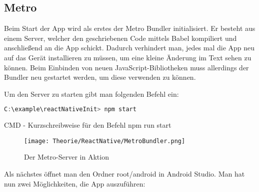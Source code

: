 \newpage
\subsection{Metro}
\label{metrobundler}
Beim Start der App wird als erstes der Metro Bundler initialisiert. Er besteht aus einem Server,
welcher den geschriebenen Code mittels Babel kompiliert und anschließend an die App schickt. Dadurch
verhindert man, jedes mal die App neu auf das Gerät installieren zu müssen, um eine kleine Änderung
im Text sehen zu können. Beim Einbinden von neuen JavaScript-Bibliotheken muss allerdings der
Bundler neu gestartet werden, um diese verwenden zu können.

Um den Server zu starten gibt man folgenden Befehl ein:

\begin{code}[htp]
\begin{lstlisting}[firstnumber=1,language=JavaScript, style=CMD]
C:\example\reactNativeInit> npm start
\end{lstlisting}
\caption{CMD - Kurzschreibweise für den Befehl npm run start}
\end{code}

\begin{figure}[H]
  \begin{center}
    \texttt{[image: Theorie/ReactNative/MetroBundler.png]}
    \caption{Der Metro-Server in Aktion}
  \end{center}
\end{figure}

\newpage
Als nächstes öffnet man den Ordner root/android in Android Studio. Man hat nun zwei Möglichkeiten,
die App auszuführen:


